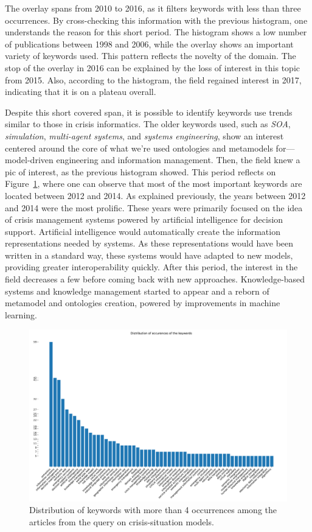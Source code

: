 The overlay spans from 2010 to 2016, as it filters keywords with less than three occurrences.
By cross-checking this information with the previous histogram, one understands the reason for this short period.
The histogram shows a low number of publications between 1998 and 2006, while the overlay shows an important variety of keywords used.
This pattern reflects the novelty of the domain.
The stop of the overlay in 2016 can be explained by the loss of interest in this topic from 2015.
Also, according to the histogram, the field regained interest in 2017, indicating that it is on a plateau overall.

Despite this short covered span, it is possible to identify keywords use trends similar to those in crisis informatics.
The older keywords used, such as \emph{SOA}, \emph{simulation}, \emph{multi-agent systems}, and \emph{systems engineering}, show an interest centered around the core of what we're used ontologies and metamodels for—model-driven engineering and information management.
Then, the field knew a pic of interest, as the previous histogram showed.
This period reflects on Figure~\ref{literature:situation-models-bar}, where one can observe that most of the most important keywords are located between 2012 and 2014.
As explained previously, the years between 2012 and 2014 were the most prolific.
These years were primarily focused on the idea of crisis management systems powered by artificial intelligence for decision support.
Artificial intelligence would automatically create the information representations needed by systems.
As these representations would have been written in a standard way, these systems would have adapted to new models, providing greater interoperability quickly.
After this period, the interest in the field decreases a few before coming back with new approaches.
Knowledge-based systems and knowledge management started to appear and a reborn of metamodel and ontologies creation, powered by improvements in machine learning.

\begin{figure}[thb]
    \includegraphics[width=\textwidth]{figures/chap-2/situation-models-bar.pdf}
    \caption{Distribution of keywords with more than 4 occurrences among the articles from the query on crisis-situation models.}
    \label{literature:situation-models-bar}
\end{figure}

